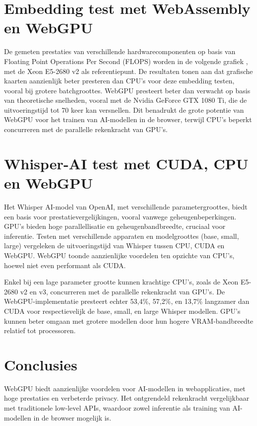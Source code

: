 \documentclass[a0,portrait]{hogent-poster}
\begin{document}
\begin{multicols}{2}
\section{Embedding test met WebAssembly en WebGPU}

De gemeten prestaties van verschillende hardwarecomponenten op basis van Floating Point Operations Per Second (FLOPS) worden in de volgende grafiek , met de Xeon E5-2680 v2 als referentiepunt. De resultaten tonen aan dat grafische kaarten aanzienlijk beter presteren dan CPU's voor deze embedding testen, vooral bij grotere batchgroottes. WebGPU presteert beter dan verwacht op basis van theoretische snelheden, vooral met de Nvidia GeForce GTX 1080 Ti, die de uitvoeringstijd tot 70 keer kan versnellen. Dit benadrukt de grote potentie van WebGPU voor het trainen van AI-modellen in de browser, terwijl CPU's beperkt concurreren met de parallelle rekenkracht van GPU's.



\section{Whisper-AI test met CUDA, CPU en WebGPU}

Het Whisper AI-model van OpenAI, met verschillende parametergroottes, biedt een basis voor prestatievergelijkingen, vooral vanwege geheugenbeperkingen. GPU's bieden hoge parallellisatie en geheugenbandbreedte, cruciaal voor inferentie. Testen met verschillende apparaten en modelgroottes (base, small, large) vergeleken de uitvoeringstijd van Whisper tussen CPU, CUDA en WebGPU. WebGPU toonde aanzienlijke voordelen ten opzichte van CPU's, hoewel niet even performant als CUDA.

Enkel bij een lage parameter grootte kunnen krachtige CPU's, zoals de Xeon E5-2680 v2 en v3, concurreren met de parallelle rekenkracht van GPU's. De WebGPU-implementatie presteert echter 53,4\%, 57,2\%, en 13,7\% langzamer dan CUDA voor respectievelijk de base, small, en large Whisper modellen. GPU's kunnen beter omgaan met grotere modellen door hun hogere VRAM-bandbreedte relatief tot processoren.



\section{Conclusies}

WebGPU biedt aanzienlijke voordelen voor AI-modellen in webapplicaties, met hoge prestaties en verbeterde privacy. Het ontgrendeld rekenkracht vergelijkbaar met traditionele low-level APIs, waardoor zowel inferentie als training van AI-modellen in de browser mogelijk is.


\end{multicols}
\end{document}
